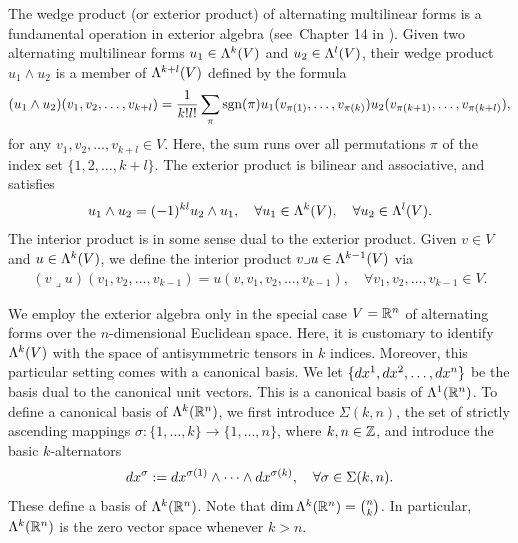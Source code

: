\documentclass[10pt,a4paper]{article}
\begin{document}
The wedge product (or exterior product) of alternating multilinear forms is a fundamental operation in exterior algebra
(see~Chapter 14 in \cite{lee2012smooth}). 
Given two alternating multilinear forms \( u_1 \in \Lambda^{k}(V) \) and \( u_2 \in \Lambda^{l}(V) \), 
their wedge product \( u_1 \wedge u_2 \) is a member of $\Lambda^{k+l}(V)$
defined by the formula 
\begin{gather*}
    (u_1 \wedge u_2)(v_1, v_2, \ldots, v_{k+l}) 
    = 
    \frac{1}{k! l!} 
    \sum_{ \pi } 
    \operatorname{sgn}(\pi) 
    u_1( v_{\pi(  1)}, \ldots, v_{\pi(k  )} ) 
    u_2( v_{\pi(k+1)}, \ldots, v_{\pi(k+l)} ),
\end{gather*}
for any \( v_1, v_2, \ldots, v_{k+l} \in V \).
Here, the sum runs over all permutations $\pi$ of the index set \(\{ 1, 2, \ldots, k+l \}\).
The exterior product is bilinear and associative, and satisfies 
\begin{align*}
    u_1 \wedge u_2 = (-1)^{kl} u_2 \wedge u_1,
    \quad 
    \forall u_1 \in \Lambda^{k}(V),
    \quad 
    \forall u_2 \in \Lambda^{l}(V).
\end{align*}
The interior product is in some sense dual to the exterior product. Given $v \in V$ and $u \in \Lambda^{k}(V)$, we define the interior product $v \lrcorner u \in \Lambda^{k-1}(V)$ via 
\begin{align*}
    (v \lrcorner u)( v_1, v_2, \ldots, v_{k-1} ) = u( v, v_1, v_2, \ldots, v_{k-1} ),
    \quad 
    \forall v_1, v_2, \ldots, v_{k-1} \in V.
\end{align*}

We employ the exterior algebra only in the special case $V = {\mathbb R}^{n}$ of alternating forms over the $n$-dimensional Euclidean space. 
Here, it is customary to identify $\Lambda^{k}(V)$ with the space of antisymmetric tensors in $k$ indices. 
Moreover, this particular setting comes with a canonical basis. 
We let \(\{dx^1, dx^2, \ldots, dx^{n}\}\) be the basis dual to the canonical unit vectors.
This is a canonical basis of $\Lambda^{1}({\mathbb R}^{n})$. 
To define a canonical basis of $\Lambda^{k}({\mathbb R}^{n})$, 
we first introduce $\Sigma(k,n)$, the set of strictly ascending mappings $\sigma : \{1,\dots,k\} \rightarrow \{1,\dots,n\}$, where $k, n \in {\mathbb Z}$, 
and introduce the basic $k$-alternators 
\begin{align*}
    dx^{\sigma} := dx^{\sigma(1)} \wedge \dots \wedge dx^{\sigma(k)}, 
    \quad 
    \forall \sigma \in \Sigma(k,n). 
\end{align*}
These define a basis of $\Lambda^{k}({\mathbb R}^{n})$.
Note that 
$\dim \Lambda^{k}({\mathbb R}^{n}) = \binom{n}{k}$. 
In particular, $\Lambda^{k}({\mathbb R}^{n})$ is the zero vector space whenever $k > n$.
\end{document}
